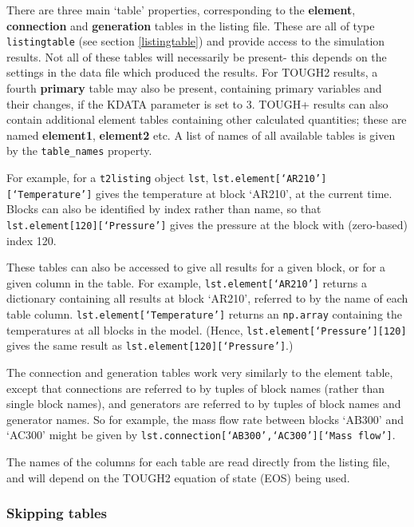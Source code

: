 There are three main `table' properties, corresponding to the \textbf{element}, \textbf{connection} and \textbf{generation} tables in the listing file.  These are all of type \texttt{listingtable} (see section \ref{listingtable}) and provide access to the simulation results.  Not all of these tables will necessarily be present- this depends on the settings in the data file which produced the results.  For TOUGH2 results, a fourth \textbf{primary} table may also be present, containing primary variables and their changes, if the KDATA parameter is set to 3.  TOUGH+ results can also contain additional element tables containing other calculated quantities; these are named \textbf{element1}, \textbf{element2} etc.  A list of names of all available tables is given by the \texttt{table\_names} property.

For example, for a \texttt{t2listing} object \texttt{lst}, \texttt{lst.element[`AR210'][`Temperature']} gives the temperature at block `AR210', at the current time.  Blocks can also be identified by index rather than name, so that \texttt{lst.element[120][`Pressure']} gives the pressure at the block with (zero-based) index 120.

These tables can also be accessed to give all results for a given block, or for a given column in the table.  For example, \texttt{lst.element[`AR210']} returns a dictionary containing all results at block `AR210', referred to by the name of each table column.  \texttt{lst.element[`Temperature']} returns an \texttt{np.array} containing the temperatures at all blocks in the model.  (Hence, \texttt{lst.element[`Pressure'][120]} gives the same result as \texttt{lst.element[120][`Pressure']}.)

The connection and generation tables work very similarly to the element table, except that connections are referred to by tuples of block names (rather than single block names), and generators are referred to by tuples of block names and generator names.  So for example, the mass flow rate between blocks `AB300' and `AC300' might be given by \texttt{lst.connection[`AB300',`AC300'][`Mass flow']}.

The names of the columns for each table are read directly from the listing file, and will depend on the TOUGH2 equation of state (EOS) being used.

\subsubsection{Skipping tables}

